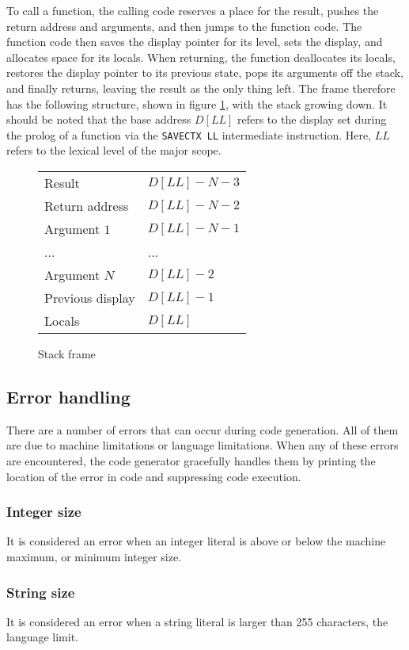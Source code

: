 \documentclass[oneside]{amsart}
\theoremstyle{definition}
\theoremstyle{remark}
\numberwithin{equation}{section}
\begin{document}
To call a function, the calling code reserves a place for the result, pushes the return address and
arguments, and then jumps to the function code. The function code then saves the display pointer for
its level, sets the display, and allocates space for its locals. When returning, the function
deallocates its locals, restores the display pointer to its previous state, pops its arguments off
the stack, and finally returns, leaving the result as the only thing left. The frame therefore has
the following structure, shown in figure \ref{fig:frame}, with the stack growing down. It should be
noted that the base address $D[LL]$ refers to the display set during the prolog of a function via
the \texttt{SAVECTX LL} intermediate instruction. Here, $LL$ refers to the lexical level of the
major scope.

\begin{figure}[h]
\caption{Stack frame}
\begin{tabular}{l|l}
Result & $D[LL] - N - 3$ \\
Return address & $D[LL] - N - 2$  \\
Argument $1$ & $D[LL] - N - 1$  \\
... & ... \\
Argument $N$ & $D[LL] - 2$ \\
Previous display & $D[LL] - 1$ \\
Locals & $D[LL]$ \\
\end{tabular}
\label{fig:frame}
\end{figure}

\subsection{Error handling}
There are a number of errors that can occur during code generation. All of them are due to machine
limitations or language limitations. When any of these errors are encountered, the code generator
gracefully handles them by printing the location of the error in code and suppressing code
execution.

\subsubsection{Integer size}
It is considered an error when an integer literal is above or below the machine maximum, or minimum
integer size.

\subsubsection{String size}
It is considered an error when a string literal is larger than 255 characters, the language limit.
\end{document}
